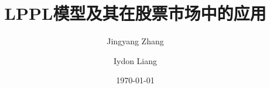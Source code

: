\documentclass[11pt, thmnum, eqsecnum, dark, nobegin, noend]{mathbeamer}
\title[LPPL]{LPPL模型及其在股票市场中的应用}
\author{Jingyang Zhang \and Iydon Liang}
\date{\today}
\institute[SUSTech]{南方科技大学}
\begin{document}
% 

\begin{frame}
    \titlepage
\end{frame}









\begin{frame}
    \begin{center}
        \LARGE\bfseries
        \color{tbg}{\Huge THANKS!}
    \end{center}
\end{frame}
\end{document}
